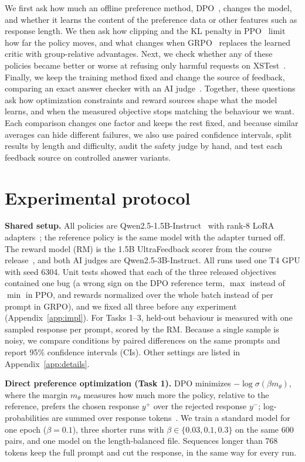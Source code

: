 \documentclass{article}
\begin{document}
We first ask how much an offline preference method, DPO~\cite{rafailov2023dpo}, changes the model, and whether it learns the content of the preference data or other features such as response length. We then ask how clipping and the KL penalty in PPO~\cite{schulman2017ppo,ouyang2022instructgpt} limit how far the policy moves, and what changes when GRPO~\cite{shao2024deepseekmath,liu2025understanding} replaces the learned critic with group-relative advantages. Next, we check whether any of these policies became better or worse at refusing only harmful requests on XSTest~\cite{rottger2023xstest}. Finally, we keep the training method fixed and change the source of feedback, comparing an exact answer checker with an AI judge~\cite{deepseek2025r1,lee2024rlaif}. Together, these questions ask how optimization constraints and reward sources shape what the model learns, and when the measured objective stops matching the behaviour we want. Each comparison changes one factor and keeps the rest fixed, and because similar averages can hide different failures, we also use paired confidence intervals, split results by length and difficulty, audit the safety judge by hand, and test each feedback source on controlled answer variants.

\section{Experimental protocol}
\textbf{Shared setup.} All policies are Qwen2.5-1.5B-Instruct~\cite{qwen2.5} with rank-8 LoRA adapters~\cite{hu2021lora}; the reference policy is the same model with the adapter turned off. The reward model (RM) is the 1.5B UltraFeedback scorer from the course release~\cite{cui2023ultrafeedback}, and both AI judges are Qwen2.5-3B-Instruct. All runs used one T4 GPU with seed 6304. Unit tests showed that each of the three released objectives contained one bug (a wrong sign on the DPO reference term, $\max$ instead of $\min$ in PPO, and rewards normalized over the whole batch instead of per prompt in GRPO), and we fixed all three before any experiment (Appendix~\ref{app:impl}). For Tasks 1--3, held-out behaviour is measured with one sampled response per prompt, scored by the RM. Because a single sample is noisy, we compare conditions by paired differences on the same prompts and report 95\% confidence intervals (CIs). Other settings are listed in Appendix~\ref{app:details}.

\textbf{Direct preference optimization (Task 1).} DPO minimizes $-\log\sigma(\beta m_\theta)$, where the margin $m_\theta$ measures how much more the policy, relative to the reference, prefers the chosen response $y^+$ over the rejected response $y^-$; log-probabilities are summed over response tokens~\cite{rafailov2023dpo}. We train a standard model for one epoch ($\beta=0.1$), three shorter runs with $\beta\in\{0.03,0.1,0.3\}$ on the same 600 pairs, and one model on the length-balanced file. Sequences longer than 768 tokens keep the full prompt and cut the response, in the same way for every run.
\end{document}
